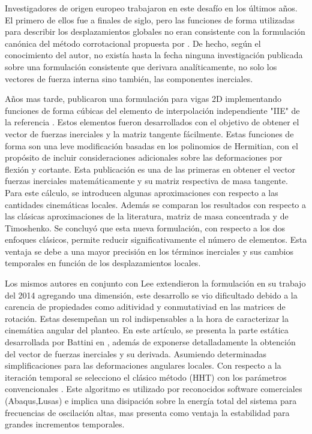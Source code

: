 Investigadores de origen europeo trabajaron en este desafío en los últimos años. El primero de ellos fue \cite{behdinan1998co} a finales de siglo, pero las funciones de forma utilizadas para describir los desplazamientos globales no eran consistente con la formulación canónica del método corrotacional propuesta por \textcite{simo1988dynamics}. De hecho, según el conocimiento del autor, no existía hasta la fecha ninguna investigación publicada sobre una formulación consistente que derivara analíticamente, no solo los vectores de fuerza interna sino también, las componentes inerciales.   

Años mas tarde, \cite{Le2011} publicaron una formulación para vigas 2D implementando funciones de forma cúbicas del elemento de interpolación independiente "IIE" de la referencia \cite{reddy1997locking}. Estos elementos fueron desarrollados con el objetivo de obtener el vector de fuerzas inerciales y la matriz tangente fácilmente. Estas funciones de forma son una leve modificación basadas en los polinomios de Hermitian, con el propósito de incluir consideraciones adicionales sobre las deformaciones por flexión y cortante. Esta publicación es una de las primeras en obtener el vector fuerzas inerciales matemáticamente y su matriz respectiva de masa tangente. Para este cálculo, se introducen algunas aproximaciones con respecto a las cantidades cinemáticas locales. Además se comparan los resultados con respecto a las clásicas aproximaciones de la literatura, matriz de masa concentrada y de Timoshenko. Se concluyó que esta nueva formulación, con respecto a los dos enfoques clásicos,  permite reducir significativamente el número de elementos. Esta ventaja se debe a una mayor precisión en los términos inerciales y sus cambios temporales en función de los desplazamientos locales.    

Los mismos autores en conjunto con Lee extendieron la formulación en su trabajo del 2014 \cite{Le2014} agregando una dimensión, este desarrollo se vio dificultado debido a la carencia de propiedades como aditividad y conmutativiad en las matrices de rotación. Estas desempeñan un rol indispensables a la hora de caracterizar la cinemática angular del planteo. En este artículo, se presenta la parte estática desarrollada por Battini en \cite{Battini2002}, además de exponerse detalladamente la obtención del vector de fuerzas inerciales y su derivada. Asumiendo determinadas simplificaciones para las deformaciones angulares locales. Con respecto a la iteración temporal se selecciono el clásico método  (\gls{HHT}) con los parámetros convencionales \citep{hilber1977improved}. Este algoritmo es utilizado por reconocidos software comerciales (Abaqus,Lusas) e implica una disipación sobre la energía total del sistema para frecuencias de oscilación altas, mas presenta como ventaja la estabilidad para grandes incrementos temporales. 

